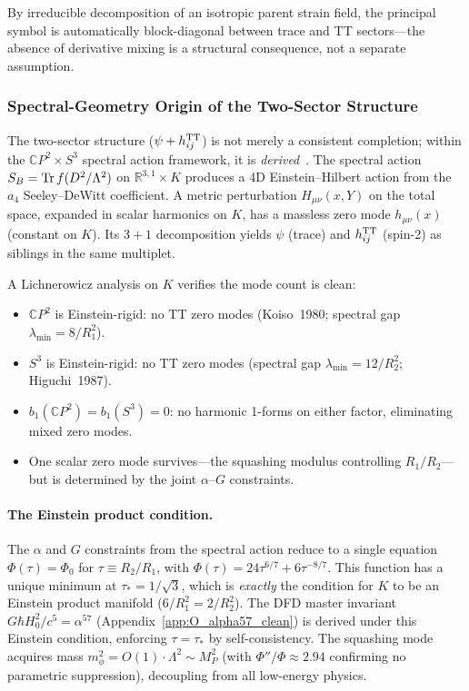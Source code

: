 By irreducible decomposition of an isotropic parent strain field, the principal symbol is automatically block-diagonal between trace and TT sectors---the absence of derivative mixing is a structural consequence, not a separate assumption.

\subsubsection{Spectral-Geometry Origin of the Two-Sector Structure}\label{sec:gw-spectral-origin}

The two-sector structure ($\psi + h_{ij}^{\rm TT}$) is not merely a consistent
completion; within the $\mathbb{C}P^2 \times S^3$ spectral action framework,
it is \emph{derived}~\cite{AlcockConstitutive2026}.  The spectral action
$S_B = {\rm Tr}\,f(D^2/\Lambda^2)$ on $\mathbb{R}^{3,1}\times K$ produces
a 4D Einstein--Hilbert action from the $a_4$ Seeley--DeWitt coefficient.
A metric perturbation $H_{\mu\nu}(x,Y)$ on the total space, expanded
in scalar harmonics on $K$, has a massless zero mode $h_{\mu\nu}(x)$
(constant on $K$).  Its $3+1$ decomposition yields $\psi$ (trace) and
$h_{ij}^{\rm TT}$ (spin-2) as siblings in the same multiplet.

A Lichnerowicz analysis on $K$ verifies the mode count is clean:
\begin{itemize}
\item $\mathbb{C}P^2$ is Einstein-rigid: no TT zero modes
  (Koiso~1980; spectral gap $\lambda_{\min} = 8/R_1^2$).
\item $S^3$ is Einstein-rigid: no TT zero modes
  (spectral gap $\lambda_{\min} = 12/R_2^2$; Higuchi~1987).
\item $b_1(\mathbb{C}P^2) = b_1(S^3) = 0$: no harmonic 1-forms
  on either factor, eliminating mixed zero modes.
\item One scalar zero mode survives---the squashing modulus
  controlling $R_1/R_2$---but is determined by the joint
  $\alpha$--$G$ constraints.
\end{itemize}

\paragraph{The Einstein product condition.}
The $\alpha$ and $G$ constraints from the spectral action reduce to a
single equation $\Phi(\tau) = \Phi_0$ for $\tau \equiv R_2/R_1$, with
$\Phi(\tau) = 24\tau^{6/7} + 6\tau^{-8/7}$.
This function has a unique minimum at $\tau_* = 1/\sqrt{3}$, which is
\emph{exactly} the condition for $K$ to be an Einstein product manifold
($6/R_1^2 = 2/R_2^2$).  The DFD master invariant $G\hbar H_0^2/c^5 =
\alpha^{57}$ (Appendix~\ref{app:O_alpha57_clean}) is derived under
this Einstein condition, enforcing $\tau = \tau_*$ by self-consistency.
The squashing mode acquires mass $m_\phi^2 = O(1)\cdot\Lambda^2 \sim M_P^2$
(with $\Phi''/\Phi \approx 2.94$ confirming no parametric suppression),
decoupling from all low-energy physics.

